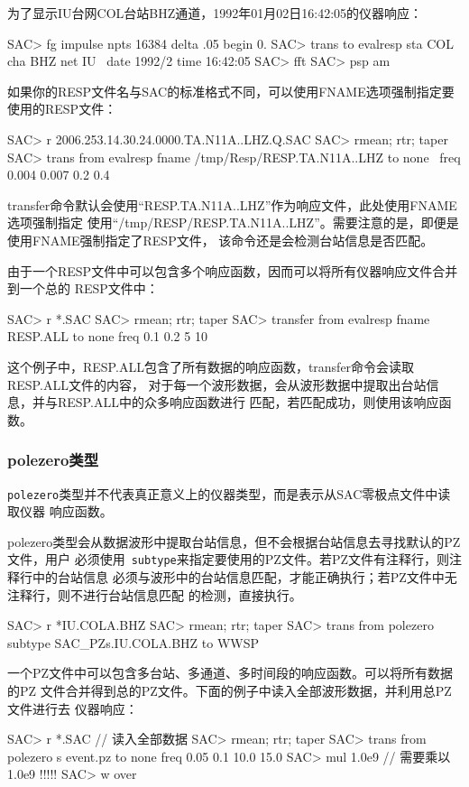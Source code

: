 为了显示IU台网COL台站BHZ通道，1992年01月02日16:42:05的仪器响应：
\begin{SACCode}
SAC> fg impulse npts 16384 delta .05 begin 0.
SAC> trans to evalresp sta COL cha BHZ net IU \
                    date 1992/2 time 16:42:05
SAC> fft
SAC> psp am
\end{SACCode}

如果你的RESP文件名与SAC的标准格式不同，可以使用FNAME选项强制指定要使用的RESP文件：
\begin{SACCode}
SAC> r 2006.253.14.30.24.0000.TA.N11A..LHZ.Q.SAC
SAC> rmean; rtr; taper
SAC> trans from evalresp fname /tmp/Resp/RESP.TA.N11A..LHZ to none \
                        freq 0.004 0.007 0.2 0.4
\end{SACCode}
transfer命令默认会使用``RESP.TA.N11A..LHZ''作为响应文件，此处使用FNAME选项强制指定
使用``/tmp/RESP/RESP.TA.N11A..LHZ''。需要注意的是，即便是使用FNAME强制指定了RESP文件，
该命令还是会检测台站信息是否匹配。

由于一个RESP文件中可以包含多个响应函数，因而可以将所有仪器响应文件合并到一个总的
RESP文件中：
\begin{SACCode}
SAC> r *.SAC
SAC> rmean; rtr; taper
SAC> transfer from evalresp fname RESP.ALL to none freq 0.1 0.2 5 10
\end{SACCode}
这个例子中，RESP.ALL包含了所有数据的响应函数，transfer命令会读取RESP.ALL文件的内容，
对于每一个波形数据，会从波形数据中提取出台站信息，并与RESP.ALL中的众多响应函数进行
匹配，若匹配成功，则使用该响应函数。

\subsubsection{polezero类型}
\verb+polezero+类型并不代表真正意义上的仪器类型，而是表示从SAC零极点文件中读取仪器
响应函数。

polezero类型会从数据波形中提取台站信息，但不会根据台站信息去寻找默认的PZ文件，用户
必须使用~\verb+subtype+来指定要使用的PZ文件。若PZ文件有注释行，则注释行中的台站信息
必须与波形中的台站信息匹配，才能正确执行；若PZ文件中无注释行，则不进行台站信息匹配
的检测，直接执行。
\begin{SACCode}
SAC> r *IU.COLA.BHZ
SAC> rmean; rtr; taper
SAC> trans from polezero subtype SAC_PZs.IU.COLA.BHZ to WWSP
\end{SACCode}

一个PZ文件中可以包含多台站、多通道、多时间段的响应函数。可以将所有数据的PZ
文件合并得到总的PZ文件。下面的例子中读入全部波形数据，并利用总PZ文件进行去
仪器响应：
\begin{SACCode}
SAC> r *.SAC          // 读入全部数据
SAC> rmean; rtr; taper
SAC> trans from polezero s event.pz to none freq 0.05 0.1 10.0 15.0
SAC> mul 1.0e9        // 需要乘以1.0e9 !!!!!
SAC> w over
\end{SACCode}


